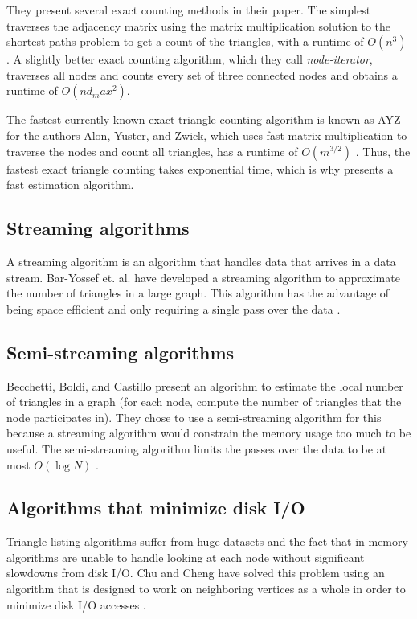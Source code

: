 \documentclass{acm_proc_article-sp}
\begin{document}
They present several exact counting methods in their paper. The simplest
traverses
the adjacency matrix using the matrix multiplication solution to the shortest
paths problem to get a count of the triangles, with a runtime of $O(n^3)$
\cite{schank:counting}. A slightly better exact counting algorithm, which they
call \textit{node-iterator}, traverses all nodes and counts every
set of three connected nodes and obtains a runtime of $O(nd_max^2)$.

The fastest currently-known exact triangle counting algorithm is known as AYZ
for the authors Alon, Yuster, and Zwick, which uses fast matrix multiplication
to traverse the nodes and count all triangles, has a runtime of $O(m^{3/2})$
\cite{ayz}. Thus, the fastest exact triangle counting takes exponential time,
which is why \cite{original} presents a fast estimation algorithm.

\subsection{Streaming algorithms}
A streaming algorithm is an algorithm that handles data that arrives in a
data stream. Bar-Yossef et. al. have developed a streaming algorithm to
approximate the number of triangles in a large graph. This algorithm has the
advantage of being space efficient and only requiring a single pass over the
data \cite{baryossef}. 

\subsection{Semi-streaming algorithms}
Becchetti, Boldi, and Castillo present an algorithm to estimate the local
number of triangles in a graph (for each node, compute the number of triangles
that the node participates in). They chose to use a semi-streaming algorithm
for this because a streaming algorithm would constrain the memory usage too
much to be useful. The semi-streaming algorithm limits the passes over the data
to be at most $O(\log N)$ \cite{becchetti}.

\subsection{Algorithms that minimize disk I/O}
Triangle listing algorithms suffer from huge datasets and the fact that
in-memory algorithms are unable to handle looking at each node without
significant slowdowns from disk I/O. Chu and Cheng have solved this problem
using an algorithm that is designed to work on neighboring vertices as a whole
in order to minimize disk I/O accesses \cite{chu}.
\end{document}
